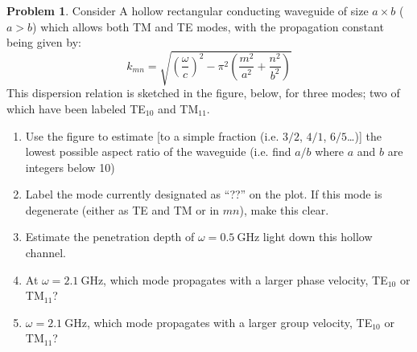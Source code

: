 \documentclass[10pt]{article}
\theoremstyle{definition}
\newtheorem{problem}{Problem}
\begin{document}
\begin{problem}
Consider A hollow rectangular conducting waveguide of size $a \times b$ ($a > b$) which
allows both TM and TE modes, with the propagation constant being given by:
$$k_{mn}=\sqrt{\left(\frac{\omega}{c}\right)^2-\pi^2\left(\frac{m^2}{a^2}+\frac{n^2}{b^2}\right)}$$
This dispersion relation is sketched in the figure, below, for three modes; two of
which have been labeled TE$_{10}$ and TM$_{11}$.
\begin{enumerate}[label=(\alph*)]
  \item Use the figure to estimate [to a simple fraction (i.e. $3/2$, $4/1$, $6/5$\dots)] the
        lowest possible aspect ratio of the waveguide (i.e. find $a/b$ where $a$ and $b$ are
        integers below 10)
  \item Label the mode currently designated as “??” on the plot. If this mode is
        degenerate (either as TE and TM or in $mn$), make this clear.
  \item Estimate the penetration depth of
        $\omega=\qty{0.5}{\giga\hertz}$ light down this hollow channel.
  \item At $\omega=\qty{2.1}{\giga\hertz}$, which mode propagates with a larger phase velocity, TE$_{10}$
        or TM$_{11}$?
  \item $\omega=\qty{2.1}{\giga\hertz}$, which mode propagates with a larger group velocity, TE$_{10}$
        or TM$_{11}$?
\end{enumerate}
\end{problem}
\end{document}
